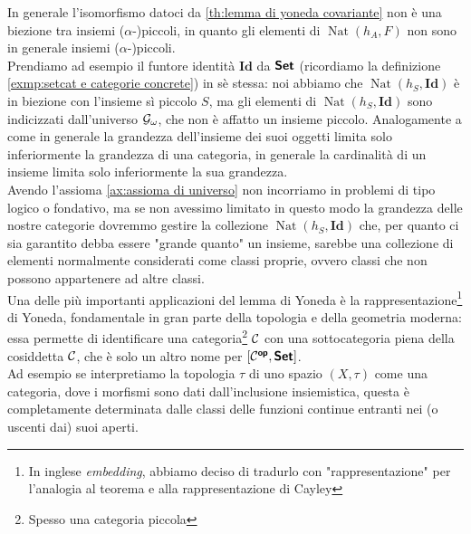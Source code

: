 \documentclass[openany]{book}
\renewcommand\C{\mc{C}}
\newcommand\nat{\operatorname{Nat}}
\begin{document}
In generale l'isomorfismo datoci da \cref{th:lemma di yoneda covariante} non è una biezione tra insiemi ($\alpha$-)piccoli, in quanto gli elementi di $\nat(h_A,F)$ non sono in generale insiemi ($\alpha$-)piccoli.\\
Prendiamo ad esempio il funtore identità $\mathbf{Id}$ da $\text{\sffamily\textbf{Set}}$ (ricordiamo la definizione \cref{exmp:setcat e categorie concrete}) in sè stessa: noi abbiamo che $\nat(h_S,\mathbf{Id})$ è in biezione con l'insieme sì piccolo $S$, ma gli elementi di $\nat(h_S,\mathbf{Id})$ sono indicizzati dall'universo $\mathcal{G}_{\omega}$, che non è affatto un insieme piccolo. Analogamente a come in generale la grandezza dell'insieme dei suoi oggetti limita solo inferiormente la grandezza di una categoria, in generale la cardinalità di un insieme limita solo inferiormente la sua grandezza.\\
Avendo l'assioma \cref{ax:assioma di universo} non incorriamo in problemi di tipo logico o fondativo, ma se non avessimo limitato in questo modo la grandezza delle nostre categorie dovremmo gestire la collezione $\nat(h_S,\mathbf{Id})$ che, per quanto ci sia garantito debba essere "grande quanto" un insieme, sarebbe una collezione di elementi normalmente considerati come classi proprie, ovvero classi che non possono appartenere ad altre classi.\\
Una delle più importanti applicazioni del lemma di Yoneda è la rappresentazione\footnote{In inglese \textit{embedding}, abbiamo deciso di tradurlo con "rappresentazione" per l'analogia al teorema e alla rappresentazione di Cayley} di Yoneda, fondamentale in gran parte della topologia e della geometria moderna: essa permette di identificare una categoria\footnote{Spesso una categoria piccola} $\C$ con una sottocategoria piena della cosiddetta  $\C$, che è solo un altro nome per $[\C^\op,\setcat]$.\\
Ad esempio se interpretiamo la topologia $\tau$ di uno spazio $(X,\tau)$ come una categoria, dove i morfismi sono dati dall'inclusione insiemistica, questa è completamente determinata dalle classi delle funzioni continue entranti nei (o uscenti dai) suoi aperti.
\end{document}
